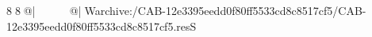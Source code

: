 8  8  @|                                                   @| W   archive:/CAB-12e3395eedd0f80ff5533cd8c8517cf5/CAB-12e3395eedd0f80ff5533cd8c8517cf5.resS 